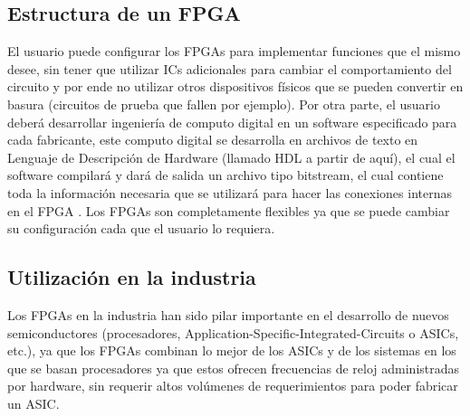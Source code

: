 \documentclass[twoside,spanish,ESP,MSc]{plantillaLabUPV}
\theoremstyle{definition}
\newcommand{\f}{FPGA }
\newcommand{\fs}{FPGAs }
\begin{document}
\subsection{Estructura de un \f}%



El usuario puede configurar los \fs   para implementar funciones que el mismo desee, sin tener que utilizar ICs adicionales para cambiar el comportamiento del circuito y por ende no utilizar otros dispositivos físicos que se pueden convertir en basura (circuitos de prueba que fallen por ejemplo). Por otra parte, el usuario deberá desarrollar ingeniería de computo digital en un software especificado para cada fabricante, este computo digital se desarrolla en archivos de texto en Lenguaje de Descripción de Hardware (llamado HDL a partir de aquí), el cual el software compilará y dará de salida un archivo tipo bitstream, el cual contiene toda la información necesaria que se utilizará para hacer las conexiones internas en el \f. Los \fs son completamente flexibles ya que se puede cambiar su configuración cada que el usuario lo requiera. 


\subsection*{Utilización en la industria}

Los \fs en la industria han sido pilar importante en el desarrollo de nuevos semiconductores (procesadores, Application-Specific-Integrated-Circuits o ASICs, etc.), ya que los \fs combinan lo mejor de los ASICs y de los sistemas en los que se basan procesadores ya que estos ofrecen frecuencias de reloj administradas por hardware, sin requerir altos volúmenes de requerimientos para poder fabricar un ASIC. %
\end{document}
